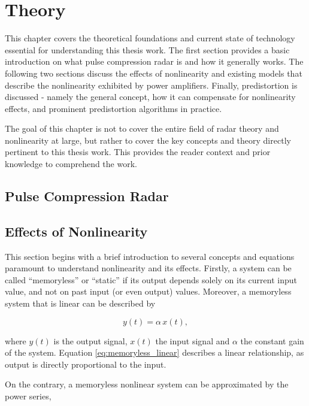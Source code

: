 %
\chapter{Theory}\label{ch:theory}

This chapter covers the theoretical foundations and current state of technology essential for understanding this thesis work. The first section provides a basic introduction on what pulse compression radar is and how it generally works. The following two sections discuss the effects of nonlinearity and existing models that describe the nonlinearity exhibited by power amplifiers. Finally, predistortion is discussed - namely the general concept, how it can compensate for nonlinearity effects, and prominent predistortion algorithms in practice.

The goal of this chapter is not to cover the entire field of radar theory and nonlinearity at large, but rather to cover the key concepts and theory directly pertinent to this thesis work. This provides the reader context and prior knowledge to comprehend the work. 

\section{Pulse Compression Radar}

\section{Effects of Nonlinearity}\label{sec:nonlinearity_effects}

This section begins with a brief introduction to several concepts and equations paramount to understand nonlinearity and its effects. Firstly, a system can be called ``memoryless'' or ``static'' if its output depends solely on its current input value, and not on past input (or even output) values. Moreover, a memoryless system that is linear can be described by \cite{razavi}

\begin{equation}
  y(t) = \alpha \, x(t),
  \label{eq:memoryless_linear}
\end{equation}

where $y(t)$ is the output signal, $x(t)$ the input signal and $\alpha$ the constant gain of the system. Equation \eqref{eq:memoryless_linear} describes a linear relationship, as output is directly proportional to the input. 

On the contrary, a memoryless nonlinear system can be approximated by the power series, \cite{razavi}

